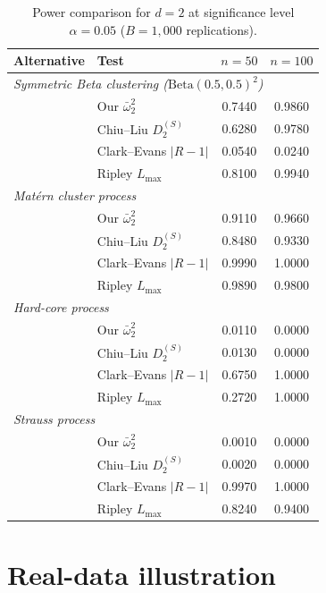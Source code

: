 \documentclass[pdflatex]{sn-jnl}
\theoremstyle{thmstyleone}
\theoremstyle{thmstyletwo}
\theoremstyle{thmstylethree}
\begin{document}
\begin{table}[htbp]
\caption{Power comparison for $d=2$ at significance level $\alpha = 0.05$ ($B = 1{,}000$ replications).}\label{tab:comparison}
\begin{tabular*}{\textwidth}{@{\extracolsep\fill}llcc}
\toprule
Alternative & Test & $n=50$ & $n=100$ \\
\midrule
\multicolumn{4}{l}{\textit{Symmetric Beta clustering ($\mathrm{Beta}(0.5,0.5)^2$)}} \\
  & Our $\bar\omega^2_2$  & 0.7440 & 0.9860 \\
  & Chiu--Liu $D_2^{(S)}$ & 0.6280 & 0.9780 \\
  & Clark--Evans $|R-1|$  & 0.0540 & 0.0240 \\
  & Ripley $L_{\max}$     & 0.8100 & 0.9940 \\
\midrule
\multicolumn{4}{l}{\textit{Mat\'ern cluster process}} \\
  & Our $\bar\omega^2_2$  & 0.9110 & 0.9660 \\
  & Chiu--Liu $D_2^{(S)}$ & 0.8480 & 0.9330 \\
  & Clark--Evans $|R-1|$  & 0.9990 & 1.0000 \\
  & Ripley $L_{\max}$     & 0.9890 & 0.9800 \\
\midrule
\multicolumn{4}{l}{\textit{Hard-core process}} \\
  & Our $\bar\omega^2_2$  & 0.0110 & 0.0000 \\
  & Chiu--Liu $D_2^{(S)}$ & 0.0130 & 0.0000 \\
  & Clark--Evans $|R-1|$  & 0.6750 & 1.0000 \\
  & Ripley $L_{\max}$     & 0.2720 & 1.0000 \\
\midrule
\multicolumn{4}{l}{\textit{Strauss process}} \\
  & Our $\bar\omega^2_2$  & 0.0010 & 0.0000 \\
  & Chiu--Liu $D_2^{(S)}$ & 0.0020 & 0.0000 \\
  & Clark--Evans $|R-1|$  & 0.9970 & 1.0000 \\
  & Ripley $L_{\max}$     & 0.8240 & 0.9400 \\
\bottomrule
\end{tabular*}
\end{table}

\section{Real-data illustration}\label{sec:application}
\end{document}
